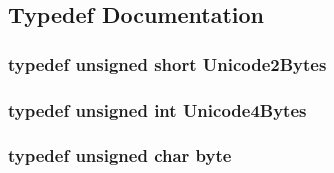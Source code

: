\subsection{Typedef Documentation}
\hypertarget{namespaceefb_acce95f2192212162af47fde5af397bea}{
\subsubsection[{Unicode2Bytes}]{\setlength{\rightskip}{0pt plus 5cm}typedef unsigned short {\bf Unicode2Bytes}}}
\label{namespaceefb_acce95f2192212162af47fde5af397bea}
\hypertarget{namespaceefb_aa0d3cfad43f6f1a2056b87427ada3b74}{
\subsubsection[{Unicode4Bytes}]{\setlength{\rightskip}{0pt plus 5cm}typedef unsigned int {\bf Unicode4Bytes}}}
\label{namespaceefb_aa0d3cfad43f6f1a2056b87427ada3b74}
\hypertarget{namespaceefb_a0c8186d9b9b7880309c27230bbb5e69d}{
\subsubsection[{byte}]{\setlength{\rightskip}{0pt plus 5cm}typedef unsigned char {\bf byte}}}
\label{namespaceefb_a0c8186d9b9b7880309c27230bbb5e69d}
